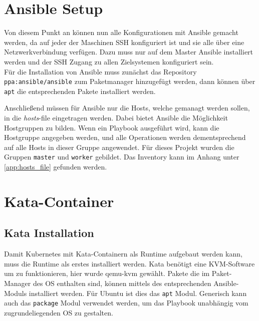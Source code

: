 \newpage

\section{Ansible Setup}
Von diesem Punkt an können nun alle Konfigurationen mit Ansible gemacht werden, da auf jeder der Maschinen \ac{SSH} konfiguriert ist und sie alle über eine Netzwerkverbindung verfügen.
Dazu muss nur auf dem Master Ansible installiert werden und der \ac{SSH} Zugang zu allen Zielsystemen konfiguriert sein. \\
Für die Installation von Ansible muss zunächst das Repository \texttt{ppa:ansible/ansible} zum Paketmanager hinzugefügt werden, dann können über \texttt{apt} die entsprechenden Pakete installiert werden.

Anschließend müssen für Ansible nur die Hosts, welche gemanagt werden sollen, in die \textit{hosts}-file eingetragen werden.
Dabei bietet Ansible die Möglichkeit Hostgruppen zu bilden. 
Wenn ein Playbook ausgeführt wird, kann die Hostgruppe angegeben werden, und alle Operationen werden dementsprechend auf alle Hosts in dieser Gruppe angewendet. 
Für dieses Projekt wurden die Gruppen \texttt{master} und \texttt{worker} gebildet.
Das Inventory kann im Anhang unter \ref{app:hosts_file} gefunden werden.

\section{Kata-Container}
\subsection{Kata Installation}

Damit Kubernetes mit Kata-Containern als Runtime aufgebaut werden kann, muss die Runtime als erstes installiert werden.
Kata benötigt eine \ac{KVM}-Software um zu funktionieren, hier wurde qemu-kvm gewählt.
Pakete die im Paket-Manager des \ac{OS} enthalten sind, können mittels des entsprechenden Ansible-Moduls installiert werden.
Für Ubuntu ist dies das \texttt{apt} Modul. 
Generisch kann auch das \texttt{package} Modul verwendet werden, um das Playbook unabhängig vom zugrundeliegenden \ac{OS} zu gestalten.

